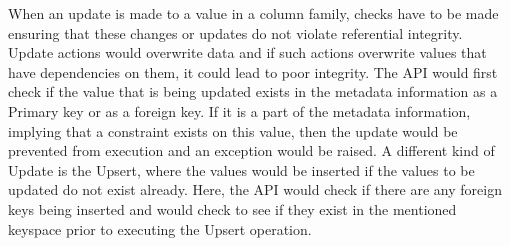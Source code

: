 When an update is made to a value in a column family, checks have to
be made ensuring that these changes or updates do not violate referential
integrity. Update actions would overwrite data and if such actions overwrite
values that have dependencies on them, it could lead to poor integrity. The API
would first check if the value that is being updated exists in the metadata
information as a Primary key or as a foreign key. If it is a part of the
metadata information, implying that a constraint exists on this value, then the
update would be prevented from execution and an exception would be raised.
A different kind of Update is the Upsert, where the values would be inserted if
the values to be updated do not exist already. Here, the API would check if
there are any foreign keys being inserted and would check to see if they exist
in the mentioned keyspace prior to executing the Upsert operation.

